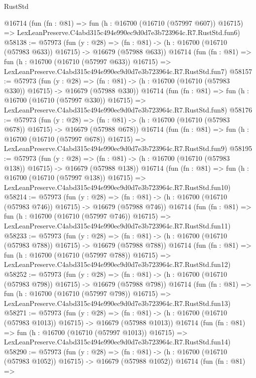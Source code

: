 \begin{lexlean}{RustStd}
\begin{coremodule}
    @16714
    (fun (fn : @81) =>
    fun (h : @16700 (@16710 (@57997 @607)) @16715) =>
    LexLeanPreserve.C4abd315c494e990ec9d0d7e3b723964c.R7.RustStd.fun6)
@58138 := @57973
    (fun (y : @28) =>
    (fn : @81) -> (h : @16700 (@16710 (@57983 @633)) @16715) -> @16679 (@57988 @633))
    @16714
    (fun (fn : @81) =>
    fun (h : @16700 (@16710 (@57997 @633)) @16715) =>
    LexLeanPreserve.C4abd315c494e990ec9d0d7e3b723964c.R7.RustStd.fun7)
@58157 := @57973
    (fun (y : @28) =>
    (fn : @81) -> (h : @16700 (@16710 (@57983 @330)) @16715) -> @16679 (@57988 @330))
    @16714
    (fun (fn : @81) =>
    fun (h : @16700 (@16710 (@57997 @330)) @16715) =>
    LexLeanPreserve.C4abd315c494e990ec9d0d7e3b723964c.R7.RustStd.fun8)
@58176 := @57973
    (fun (y : @28) =>
    (fn : @81) -> (h : @16700 (@16710 (@57983 @678)) @16715) -> @16679 (@57988 @678))
    @16714
    (fun (fn : @81) =>
    fun (h : @16700 (@16710 (@57997 @678)) @16715) =>
    LexLeanPreserve.C4abd315c494e990ec9d0d7e3b723964c.R7.RustStd.fun9)
@58195 := @57973
    (fun (y : @28) =>
    (fn : @81) -> (h : @16700 (@16710 (@57983 @138)) @16715) -> @16679 (@57988 @138))
    @16714
    (fun (fn : @81) =>
    fun (h : @16700 (@16710 (@57997 @138)) @16715) =>
    LexLeanPreserve.C4abd315c494e990ec9d0d7e3b723964c.R7.RustStd.fun10)
@58214 := @57973
    (fun (y : @28) =>
    (fn : @81) -> (h : @16700 (@16710 (@57983 @746)) @16715) -> @16679 (@57988 @746))
    @16714
    (fun (fn : @81) =>
    fun (h : @16700 (@16710 (@57997 @746)) @16715) =>
    LexLeanPreserve.C4abd315c494e990ec9d0d7e3b723964c.R7.RustStd.fun11)
@58233 := @57973
    (fun (y : @28) =>
    (fn : @81) -> (h : @16700 (@16710 (@57983 @788)) @16715) -> @16679 (@57988 @788))
    @16714
    (fun (fn : @81) =>
    fun (h : @16700 (@16710 (@57997 @788)) @16715) =>
    LexLeanPreserve.C4abd315c494e990ec9d0d7e3b723964c.R7.RustStd.fun12)
@58252 := @57973
    (fun (y : @28) =>
    (fn : @81) -> (h : @16700 (@16710 (@57983 @798)) @16715) -> @16679 (@57988 @798))
    @16714
    (fun (fn : @81) =>
    fun (h : @16700 (@16710 (@57997 @798)) @16715) =>
    LexLeanPreserve.C4abd315c494e990ec9d0d7e3b723964c.R7.RustStd.fun13)
@58271 := @57973
    (fun (y : @28) =>
    (fn : @81) -> (h : @16700 (@16710 (@57983 @1013)) @16715) -> @16679 (@57988 @1013))
    @16714
    (fun (fn : @81) =>
    fun (h : @16700 (@16710 (@57997 @1013)) @16715) =>
    LexLeanPreserve.C4abd315c494e990ec9d0d7e3b723964c.R7.RustStd.fun14)
@58290 := @57973
    (fun (y : @28) =>
    (fn : @81) -> (h : @16700 (@16710 (@57983 @1052)) @16715) -> @16679 (@57988 @1052))
    @16714
    (fun (fn : @81) =>

\end{coremodule}
\end{lexlean}
